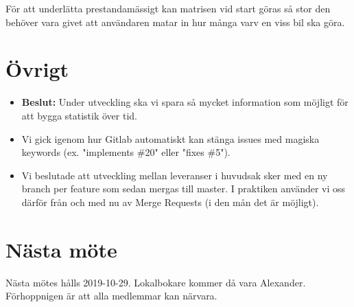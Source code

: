 \documentclass[11pt,a4paper]{article}
\begin{document}
	För att underlätta prestandamässigt kan matrisen vid start göras så stor den
	behöver vara givet att användaren matar in hur många varv en viss bil ska
	göra.

    \section*{Övrigt}
    \begin{itemize}
		\item \textbf{Beslut: } Under utveckling ska vi spara så mycket
			information som möjligt för att bygga statistik över tid.
		\item Vi gick igenom hur Gitlab automatiskt kan stänga issues med
				magiska keywords (ex. "implements \#20" eller "fixes \#5").
		\item Vi beslutade att utveckling mellan leveranser i huvudsak sker
				med en ny branch per feature som sedan mergas till master. I
				praktiken använder vi oss därför från och med nu av Merge 
				Requests (i den mån det är möjligt).
    \end{itemize}

    \section*{Nästa möte}
    Nästa mötes hålls 2019-10-29. Lokalbokare kommer då vara Alexander.
	Förhoppnigen är att alla medlemmar kan närvara. 
\end{document}
